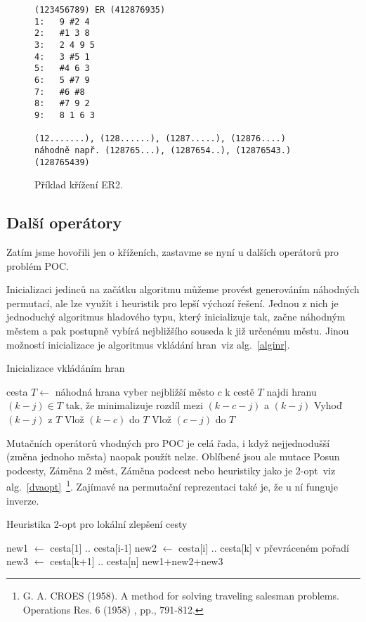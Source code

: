 \begin{figure}%
\begin{verbatim}
(123456789) ER (412876935)
1:   9 #2 4
2:   #1 3 8
3:   2 4 9 5
4:   3 #5 1
5:   #4 6 3
6:   5 #7 9
7:   #6 #8
8:   #7 9 2
9:   8 1 6 3

(12.......), (128......), (1287.....), (12876....)
náhodně např. (128765...), (1287654..), (12876543.)
(128765439)
\end{verbatim}
\caption{Příklad křížení ER2.}%
\label{ER2}%
\end{figure}

\subsection{Další operátory}

Zatím jsme hovořili jen o kříženích, zastavme se nyní u dalších operátorů pro problém POC. 

Inicializaci jedinců na začátku algoritmu můžeme provést generováním náhodných permutací, ale lze využít i heuristik pro lepší výchozí řešení. Jednou z nich je jednoduchý algoritmus hladového typu, který inicializuje tak, začne náhodným městem a pak postupně vybírá nejbližšího souseda k již určenému městu. Jinou možností inicializace je algoritmus vkládání hran~viz alg.~\ref{alginr}.


\begin{algorithm}
\caption{Inicializace vkládáním hran}
\label{alginr}
\begin{algorithmic}
\State cesta $T \gets$ náhodná hrana
\State vyber nejbližší město $c$ k cestě $T$
\State najdi hranu $(k-j)\in T$ tak, že minimalizuje rozdíl mezi $(k-c-j)$ a $(k-j)$
\State Vyhoď $(k-j)$ z $T$
\State Vlož $(k-c)$ do $T$
\State Vlož $(c-j)$ do $T$
\EndWhile
\EndProcedure
\end{algorithmic}
\end{algorithm}

Mutačních operátorů vhodných pro POC je celá řada, i když nejjednodušší (změna jednoho města) naopak použít nelze. Oblíbené jsou ale mutace 
Posun podcesty, Záměna 2 měst, Záměna podcest nebo heuristiky jako je 2-opt~viz alg.~\ref{dvaopt}~\footnote{G. A. CROES (1958). A method for solving traveling salesman problems. Operations Res. 6 (1958) , pp., 791-812.}. 
Zajímavé na permutační reprezentaci také je, že u ní funguje inverze. 


\begin{algorithm}
\caption{Heuristika 2-opt pro lokální zlepšení cesty}
\label{dvaopt}
\begin{algorithmic}
\State new1 $\gets$ cesta[1] .. cesta[i-1]
\State new2 $\gets$ cesta[i] .. cesta[k] v převráceném pořadí
\State new3 $\gets$ cesta[k+1] .. cesta[n]
\Return new1+new2+new3
\EndProcedure
\end{algorithmic}
\end{algorithm}


